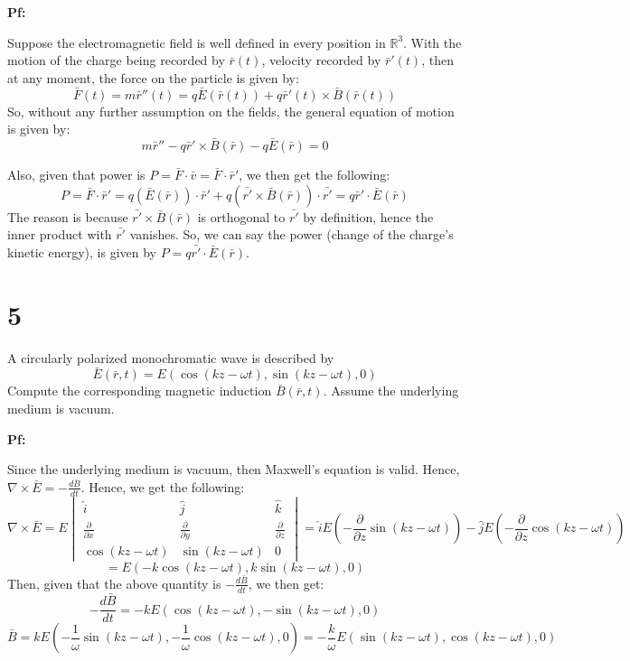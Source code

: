 \documentclass{article}
\begin{document}
\textbf{Pf:}

Suppose the electromagnetic field is well defined in every position in $\mathbb{R}^3$. With the motion of the charge being recorded by $\bar{r}(t)$,
velocity recorded by $\bar{r}'(t)$, then at any moment, the force on the particle is given by:
$$\bar{F}(t) = m\bar{r}''(t)=q\bar{E}(\bar{r}(t))+q\bar{r}'(t)\times \bar{B}(\bar{r}(t))$$
So, without any further assumption on the fields, the general equation of motion is given by:
$$m\bar{r}''-q\bar{r}'\times \bar{B}(\bar{r})-q\bar{E}(\bar{r}) = 0$$

\hfil

Also, given that power is $P=\bar{F}\cdot \bar{v} = \bar{F}\cdot \bar{r}'$, we then get the following:
$$P=\bar{F}\cdot \bar{r}' = q(\bar{E}(\bar{r}))\cdot \bar{r}' + q(\bar{r'}\times \bar{B}(\bar{r}))\cdot \bar{r'} = q\bar{r}'\cdot \bar{E}(\bar{r})$$
The reason is because $\bar{r'}\times \bar{B}(\bar{r})$ is orthogonal to $\bar{r'}$ by definition, hence the inner product with $\bar{r'}$ vanishes.
So, we can say the power (change of the charge's kinetic energy), is given by $P=q\bar{r'}\cdot \bar{E}(\bar{r})$.

\hfil

\hfil

\section*{5}
\begin{myBox}[]{}
    A circularly polarized monochromatic wave is described by
    $$\bar{E}(\bar{r},t)=E(\cos(kz-\omega t),\sin(kz-\omega t),0)$$
    Compute the corresponding magnetic induction $\bar{B}(\bar{r},t)$. Assume the underlying medium is vacuum.
\end{myBox}

\textbf{Pf:}

Since the underlying medium is vacuum, then Maxwell's equation is valid. Hence, $\nabla\times \bar{E}=-\frac{d\bar{B}}{dt}$.
Hence, we get the following:
$$\nabla\times \bar{E} = E\begin{vmatrix}
    \hat{i}&\hat{j}&\hat{k}\\
    \frac{\partial}{\partial x} & \frac{\partial}{\partial y} & \frac{\partial}{\partial z}\\
    \cos(kz-\omega t)&\sin(kz-\omega t)&0
\end{vmatrix} = \hat{i}E\left(-\frac{\partial}{\partial z}\sin(kz-\omega t)\right) -\hat{j}E\left(-\frac{\partial}{\partial z}\cos(kz-\omega t)\right)$$
$$ = E(-k\cos(kz-\omega t),k\sin(kz-\omega t),0)$$
Then, given that the above quantity is $-\frac{d\bar{B}}{dt}$, we then get:
$$-\frac{d\bar{B}}{dt}=-kE(\cos(kz-\omega t),-\sin(kz-\omega t),0)$$
$$\bar{B} = kE\left(-\frac{1}{\omega}\sin(kz-\omega t),-\frac{1}{\omega}\cos(kz-\omega t),0\right) = -\frac{k}{\omega }E(\sin(kz-\omega t),\cos(kz-\omega t),0)$$
\end{document}
